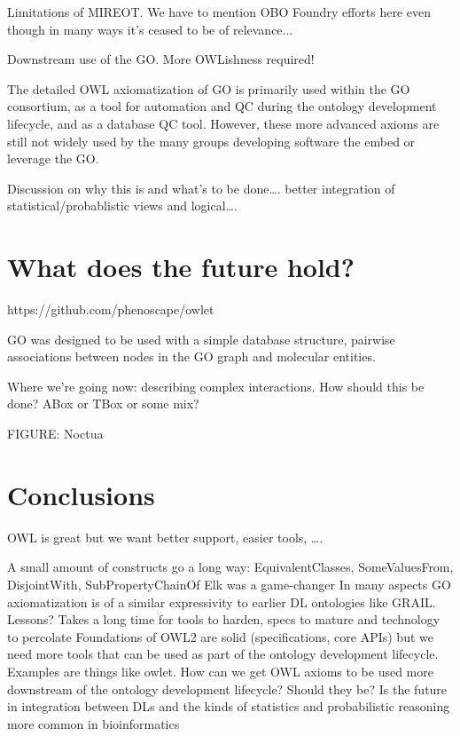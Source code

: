 \documentclass{llncs}
\begin{document}
Limitations of MIREOT. We have to mention OBO Foundry efforts here even though in many ways it’s ceased to be of relevance...

Downstream use of the GO. More OWLishness required!

The detailed OWL axiomatization of GO is primarily used within the GO consortium, as a tool for automation and QC during the ontology development lifecycle, and as a database QC tool. However, these more advanced axioms are still not widely used by the many groups developing software the embed or leverage the GO.

Discussion on why this is and what’s to be done…. better integration of statistical/probablistic views and logical….


\section{What does the future hold?}

https://github.com/phenoscape/owlet

GO was designed to be used with a simple database structure, pairwise associations between nodes in the GO graph and molecular entities. 

Where we’re going now: describing complex interactions. How should this be done? ABox or TBox or some mix? 

FIGURE: Noctua

\section{Conclusions}


OWL is great but we want better support, easier tools, ….

A small amount of constructs go a long way: EquivalentClasses, SomeValuesFrom, DisjointWith, SubProperty{Chain}Of
Elk was a game-changer
In many aspects GO axiomatization is of a similar expressivity to earlier DL ontologies like GRAIL. Lessons? Takes a long time for tools to harden, specs to mature and technology to percolate
Foundations of OWL2 are solid (specifications, core APIs) but we need more tools that can be used as part of the ontology development lifecycle. Examples are things like owlet.
How can we get OWL axioms to be used more downstream of the ontology development lifecycle? Should they be? Is the future in integration between DLs and the kinds of statistics and probabilistic reasoning more common in bioinformatics
\end{document}
